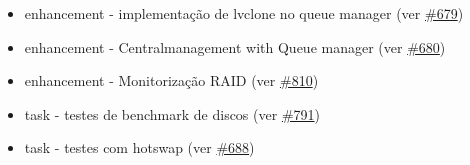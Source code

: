 \begin{itemize}
	\item enhancement - implementação de lvclone no queue manager (ver \href{https://srcmaster.eurotux.com/pm/p/etva/ticket/679}{\#679})
	\item enhancement - Centralmanagement with Queue manager (ver \href{https://srcmaster.eurotux.com/pm/p/etva/ticket/680}{\#680})
	\item enhancement - Monitorização RAID (ver \href{https://srcmaster.eurotux.com/pm/p/etva/ticket/810}{\#810})
	\item task - testes de benchmark de discos (ver \href{https://srcmaster.eurotux.com/pm/p/etva/ticket/791}{\#791})
	\item task - testes com hotswap (ver \href{https://srcmaster.eurotux.com/pm/p/etva/ticket/688}{\#688})
\end{itemize}
